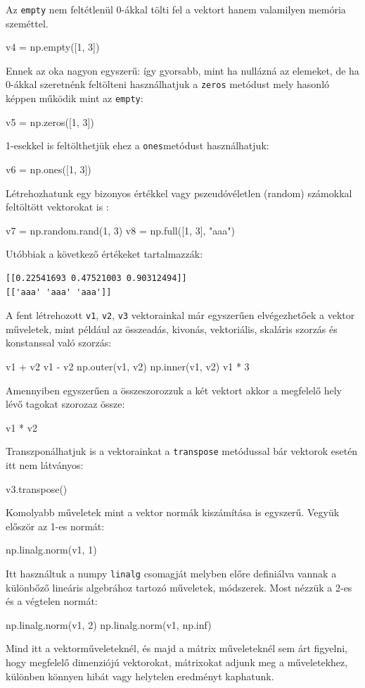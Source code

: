 Az \texttt{empty} nem feltétlenül 0-ákkal tölti fel a vektort hanem valamilyen
memória szeméttel.
\begin{python}
v4 = np.empty([1, 3])
\end{python}
Ennek az oka nagyon egyszerű: így gyorsabb, mint ha
nullázná az elemeket, de ha 0-ákkal szeretnénk feltölteni használhatjuk
a \texttt{zeros} metódust mely hasonló képpen működik mint az
\texttt{empty}:
\begin{python}
v5 = np.zeros([1, 3])
\end{python}
    1-esekkel is feltölthetjük ehez a \texttt{ones}metódust használhatjuk:
\begin{python}
v6 = np.ones([1, 3])
\end{python}
    Létrehozhatunk egy bizonyos értékkel vagy pszeudóvéletlen (random)
számokkal feltöltött vektorokat is :
\begin{python}
v7 = np.random.rand(1, 3)
v8 = np.full([1, 3], "aaa")
\end{python}
Utóbbiak a következő értékeket tartalmazzák:
\begin{verbatim}
[[0.22541693 0.47521003 0.90312494]]
[['aaa' 'aaa' 'aaa']]
\end{verbatim}
    A fent létrehozott \texttt{v1}, \texttt{v2}, \texttt{v3} vektorainkal
már egyszerűen elvégezhetőek a vektor műveletek, mint például az
összeadás, kivonás, vektoriális, skaláris szorzás és konstanssal való szorzás:
\begin{python}
v1 + v2
v1 - v2
np.outer(v1, v2)
np.inner(v1, v2)
v1 * 3
\end{python}
Amennyiben egyszerűen a összeszorozzuk a két vektort akkor a megfelelő hely lévő
tagokat szorozaz össze:
\begin{python}
v1 * v2
\end{python}
Transzponálhatjuk is a vektorainkat a \texttt{transpose} metódussal bár
vektorok esetén itt nem látványos:
\begin{python}
v3.transpose()
\end{python}
Komolyabb műveletek mint a vektor normák kiszámítása is egyszerű. Vegyük
először az 1-es normát:
\begin{python}
np.linalg.norm(v1, 1)
\end{python}
Itt használtuk a numpy \texttt{linalg} csomagját melyben előre
definiálva vannak a különbőző lineáris algebrához tartozó műveletek,
módszerek. Most nézzük a 2-es és a végtelen normát:
\begin{python}
np.linalg.norm(v1, 2)
np.linalg.norm(v1, np.inf)
\end{python}
    Mind itt a vektorműveleteknél, és majd a mátrix műveleteknél sem árt
figyelni, hogy megfelelő dimenziójú vektorokat, mátrixokat adjunk meg a
műveletekhez, különben könnyen hibát vagy helytelen eredményt kaphatunk.

